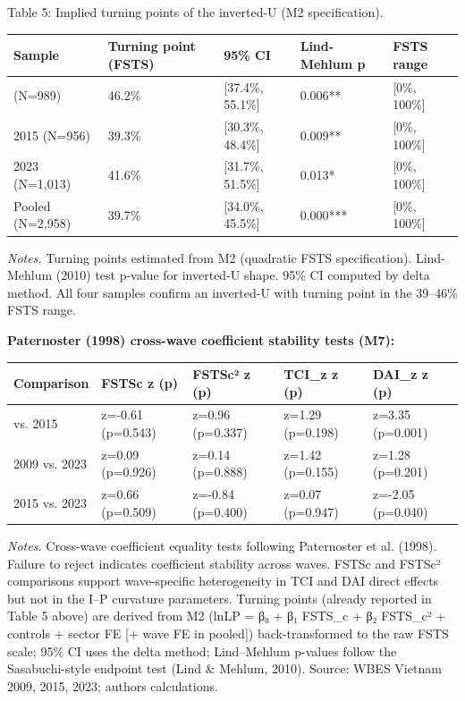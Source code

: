 \documentclass[12pt,a4paper]{article}
\begin{document}
Table 5: Implied turning points of the inverted-U (M2 specification).

\begin{longtable}[]{@{}lllll@{}}
\toprule\noalign{}
Sample & Turning point (FSTS) & 95\% CI & Lind-Mehlum p & FSTS range \\
\midrule\noalign{}
\endhead
\bottomrule\noalign{}
\endlastfoot
2009 (N=989) & 46.2\% & {[}37.4\%, 55.1\%{]} & 0.006** & {[}0\%,
100\%{]} \\
2015 (N=956) & 39.3\% & {[}30.3\%, 48.4\%{]} & 0.009** & {[}0\%,
100\%{]} \\
2023 (N=1,013) & 41.6\% & {[}31.7\%, 51.5\%{]} & 0.013* & {[}0\%,
100\%{]} \\
Pooled (N=2,958) & 39.7\% & {[}34.0\%, 45.5\%{]} & 0.000*** & {[}0\%,
100\%{]} \\
\end{longtable}

\emph{Notes.} Turning points estimated from M2 (quadratic FSTS
specification). Lind-Mehlum (2010) test p-value for inverted-U shape.
95\% CI computed by delta method. All four samples confirm an inverted-U
with turning point in the 39--46\% FSTS range.

\textbf{Paternoster (1998) cross-wave coefficient stability tests (M7):}

\begin{longtable}[]{@{}lllll@{}}
\toprule\noalign{}
Comparison & FSTSc z (p) & FSTSc² z (p) & TCI\_z z (p) & DAI\_z z (p) \\
\midrule\noalign{}
\endhead
\bottomrule\noalign{}
\endlastfoot
2009 vs. 2015 & z=-0.61 (p=0.543) & z=0.96 (p=0.337) & z=1.29 (p=0.198)
& z=3.35 (p=0.001) \\
2009 vs. 2023 & z=0.09 (p=0.926) & z=0.14 (p=0.888) & z=1.42 (p=0.155) &
z=1.28 (p=0.201) \\
2015 vs. 2023 & z=0.66 (p=0.509) & z=-0.84 (p=0.400) & z=0.07 (p=0.947)
& z=-2.05 (p=0.040) \\
\end{longtable}

\emph{Notes.} Cross-wave coefficient equality tests following
Paternoster et al. (1998). Failure to reject indicates coefficient
stability across waves. FSTSc and FSTSc² comparisons support
wave-specific heterogeneity in TCI and DAI direct effects but not in the
I--P curvature parameters. Turning points (already reported in Table 5
above) are derived from M2 (lnLP = β₀ + β₁ FSTS\_c + β₂ FSTS\_c² +
controls + sector FE {[}+ wave FE in pooled{]}) back-transformed to the
raw FSTS scale; 95\% CI uses the delta method; Lind--Mehlum p-values
follow the Sasabuchi-style endpoint test (Lind \& Mehlum, 2010). Source:
WBES Vietnam 2009, 2015, 2023; authors\textquotesingle{} calculations.
\end{document}
